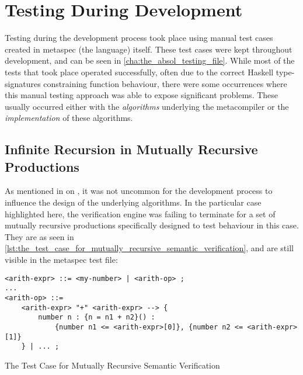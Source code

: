 

\section{Testing During Development} %
\label{sec:testing_during_development}
Testing during the development process took place using manual test cases created in \gls{metaspec} (the language) itself.
These test cases were kept throughout development, and can be seen in \autoref{cha:the_absol_testing_file}.
While most of the tests that took place operated successfully, often due to the correct Haskell type-signatures constraining function behaviour, there were some occurrences where this manual testing approach was able to expose significant problems.
These usually occurred either with the \textit{algorithms} underlying the metacompiler or the \textit{implementation} of these algorithms.

\subsection{Infinite Recursion in Mutually Recursive Productions} %
\label{sub:infinite_recursion_in_mutually_recursive_productions}
As mentioned in  on , it was not uncommon for the development process to influence the design of the underlying algorithms.
In the particular case highlighted here, the verification engine was failing to terminate for a set of mutually recursive productions specifically designed to test behaviour in this case. 
They are as seen in \autoref{lst:the_test_case_for_mutually_recursive_semantic_verification}, and are still visible in the metaspec test file:
\begin{listing}[!htb]
\begin{verbatim}
<arith-expr> ::= <my-number> | <arith-op> ;
...
<arith-op> ::= 
    <arith-expr> "+" <arith-expr> --> {
        number n : {n = n1 + n2}() :
            {number n1 <= <arith-expr>[0]}, {number n2 <= <arith-expr>[1]}
    } | ... ;
\end{verbatim}
\caption{The Test Case for Mutually Recursive Semantic Verification}
\label{lst:the_test_case_for_mutually_recursive_semantic_verification}
\end{listing}

